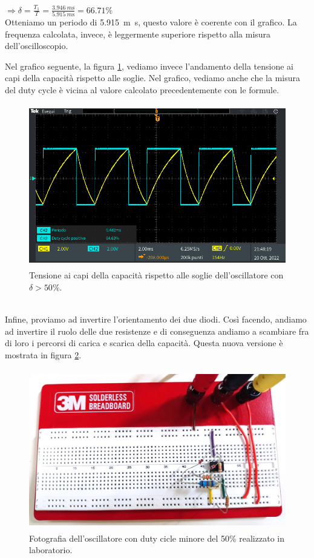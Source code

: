 \documentclass{report}
\begin{document}
\\[6pt]\indent$\Rightarrow\displaystyle{\delta=\frac{T_1}{T}=\frac{\SI{3.946}{m\second}}{\SI{5.915}{m\second}}= 66.71\%}$
\\[4pt]Otteniamo un periodo di \SI{5.915}{m\second}, questo valore è coerente con il grafico. La frequenza calcolata, invece, è  leggermente superiore rispetto alla misura dell'oscilloscopio.\par
Nel grafico seguente, la figura \ref{figura:oscillo4_1_soglie}, vediamo invece l'andamento della tensione ai capi della capacità rispetto alle soglie. Nel grafico, vediamo anche che la misura del duty cycle è vicina al valore calcolato precedentemente con le formule.
\begin{figure}[h!]
	\centering
	\includegraphics[height=7.1cm]{immagini/TEK00038}
	\caption{Tensione ai capi della capacità rispetto alle soglie dell'oscillatore con $\delta>50\%$.}
	\label{figura:oscillo4_1_soglie}
\end{figure}
\\Infine, proviamo ad invertire l'orientamento dei due diodi. Così facendo, andiamo ad invertire il ruolo delle due resistenze e di conseguenza andiamo a scambiare fra di loro i percorsi di carica e scarica della capacità. Questa nuova versione è mostrata in figura \ref{figura:circuito4_2}.
\begin{figure}[h!]
	\centering
	\includegraphics[height=7cm]{immagini/circuito4_2.jpg}
	\caption{Fotografia dell'oscillatore con duty cicle minore del 50\% realizzato in laboratorio.}
	\label{figura:circuito4_2}
\end{figure}
\end{document}
